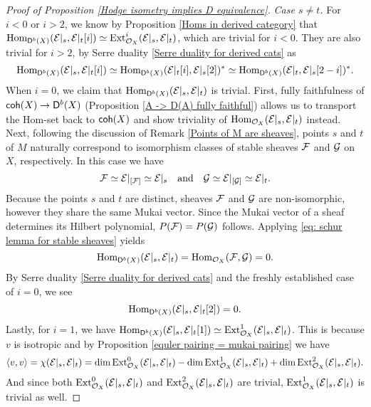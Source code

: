 \begin{proof}[Proof of Proposition \ref{Hodge isometry implies D equivalence}]
    \noindent
    \textsl{Case $s \neq t$.}  
    For $i < 0$ or $i > 2$, we know by Proposition \ref{Homs in derived category} that $\mathrm{Hom}_{\mathsf{D}^b(X)}(\mathcal E|_s, \mathcal E|_t[i]) \simeq \operatorname{Ext}^i_{{\mathcal{O}_{X}}}(\mathcal E|_s, \mathcal E|_t)$, which are trivial for $i < 0$. They are also trivial for $i > 2$, by Serre duality \ref{Serre duality for derived cats} as
    \[
        \mathrm{Hom}_{\mathsf{D}^b(X)}(\mathcal E|_s, \mathcal E|_t[i]) \simeq \mathrm{Hom}_{\mathsf{D}^b(X)}(\mathcal E|_t[i], \mathcal E|_s[2])^* \simeq \mathrm{Hom}_{\mathsf{D}^b(X)}(\mathcal E|_t, \mathcal E|_s[2-i])^*.
    \]
    When $i = 0$, we claim that $\mathrm{Hom}_{\mathsf{D}^b(X)}(\mathcal E|_s, \mathcal E|_t)$ is trivial. First, fully faithfulness of $\mathsf{coh}(X) \to \mathsf{D}^b(X)$ (\cf Proposition \ref{A -> D(A) fully faithful}) allows us to transport the Hom-set back to $\mathsf{coh}(X)$ and show triviality of $\mathrm{Hom}_{{\mathcal{O}_{X}}}(\mathcal E|_s, \mathcal E|_t)$ instead. Next, following the discussion of Remark \ref{Points of M are sheaves}, points $s$ and $t$ of $M$ naturally correspond to isomorphism classes of stable sheaves $\mathcal F$ and $\mathcal G$ on $X$, respectively. In this case we have
    \[
        \mathcal F \simeq \mathcal E|_{[\mathcal F]} \simeq \mathcal E|_s \quad \text{and} \quad \mathcal G \simeq \mathcal E|_{[\mathcal G]} \simeq \mathcal E|_t.
    \]
    Because the points $s$ and $t$ are distinct, sheaves $\mathcal F$ and $\mathcal G$ are non-isomorphic, however they share the same Mukai vector. Since the Mukai vector of a sheaf determines its Hilbert polynomial, $P(\mathcal F) = P(\mathcal G)$ follows. Applying \eqref{eq: schur lemma for stable sheaves} yields 
    \[
        \mathrm{Hom}_{\mathsf{D}^b(X)}(\mathcal E|_s, \mathcal E|_t) = \mathrm{Hom}_{{\mathcal{O}_{X}}}(\mathcal F, \mathcal G)= 0. 
    \]
    By Serre duality \ref{Serre duality for derived cats} and the freshly established case of $i = 0$, we see 
    \[
        \mathrm{Hom}_{\mathsf{D}^b(X)}(\mathcal E|_s, \mathcal E|_t[2]) = 0.
    \]
    Lastly, for $i = 1$, we have $\mathrm{Hom}_{\mathsf{D}^b(X)}(\mathcal E|_s, \mathcal E|_t[1]) \simeq \operatorname{Ext}^1_{\mathcal{O}_{X}}(\mathcal E|_s, \mathcal E|_t)$. This is because $v$ is isotropic and by Proposition \ref{equler pairing = mukai pairing} we have
    \[
        \langle v, v \rangle = \chi(\mathcal E|_s, \mathcal E|_t) = \dim\operatorname{Ext}^0_{\mathcal{O}_{X}}(\mathcal E|_s, \mathcal E|_t) - \dim\operatorname{Ext}^1_{\mathcal{O}_{X}}(\mathcal E|_s, \mathcal E|_t) + \dim\operatorname{Ext}^2_{\mathcal{O}_{X}}(\mathcal E|_s, \mathcal E|_t).
    \]
    And since both $\operatorname{Ext}^0_{\mathcal{O}_{X}}(\mathcal E|_s, \mathcal E|_t)$ and $\operatorname{Ext}^2_{\mathcal{O}_{X}}(\mathcal E|_s, \mathcal E|_t)$ are trivial, $\operatorname{Ext}^1_{\mathcal{O}_{X}}(\mathcal E|_s, \mathcal E|_t)$ is trivial as well.


\end{proof}
